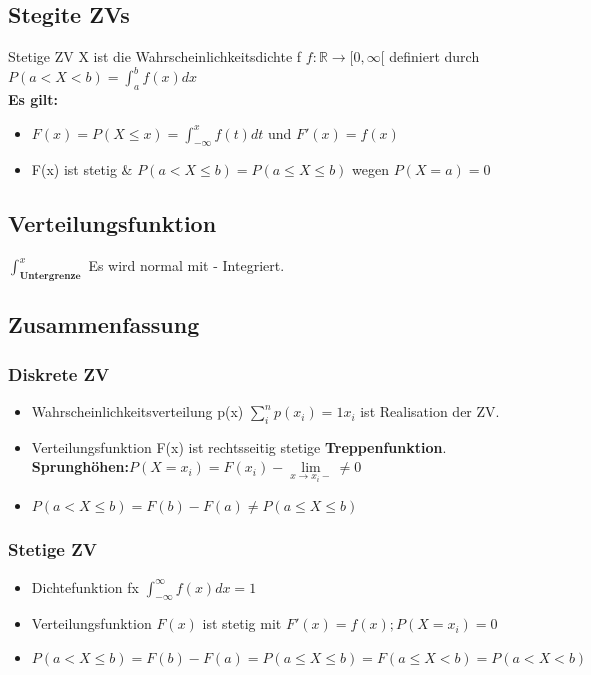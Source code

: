 \subsection{Stegite ZVs}
Stetige ZV X ist die Wahrscheinlichkeitsdichte f $ f : \mathbb{R} \rightarrow [0,\infty[$ definiert durch\\
$P(a < X < b) = \int_{a}^{b} f(x) dx$\\
\textbf{Es gilt:}
\begin{itemize}
	\item $F(x) = P(X \leq x) = \int_{-\infty}^{x} f(t) dt$ und $F'(x) = f(x)$
	\item F(x) ist stetig \& $P(a < X \leq b) = P(a \leq X \leq b)$ wegen $P(X = a) = 0$
\end{itemize}
\subsection{Verteilungsfunktion}
$\int_{\textbf{Untergrenze}}^{x}$ Es wird normal mit - Integriert.
\subsection{Zusammenfassung}
\subsubsection{Diskrete ZV}
\begin{itemize}
	\item Wahrscheinlichkeitsverteilung p(x) $\sum_{i}^{n} p(x_{i}) = 1 x_{i}$ ist Realisation der ZV.
	\item Verteilungsfunktion F(x) ist rechtsseitig  stetige \textbf{Treppenfunktion}. \textbf{Sprunghöhen:}$P(X = x_{i}) = F(x_{i}) - \lim\limits_{x \to x_{i}-} \ne 0$
	\item $P(a < X \le b) = F(b)- F(a) \ne P(a \le X \le b)$
\end{itemize}
\subsubsection{Stetige ZV}
\begin{itemize}
	\item Dichtefunktion fx $\int_{-\infty}^{\infty} f(x) dx = 1$
	\item Verteilungsfunktion $F(x)$ ist stetig mit $F'(x) = f(x); P(X = x_{i}) = 0$
	\item $P(a < X \leq b ) = F(b) - F(a) = P( a \leq X \leq b) = F(a \leq X < b) = P(a < X < b)$
\end{itemize}
